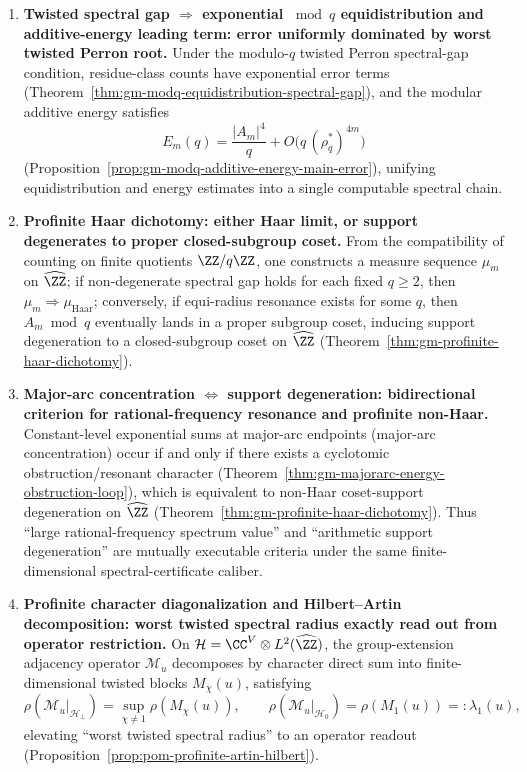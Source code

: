 \begin{enumerate}
  \item \textbf{Twisted spectral gap \texorpdfstring{$\Rightarrow$}{=>} exponential \texorpdfstring{$\bmod q$}{mod q} equidistribution and additive-energy leading term: error uniformly dominated by worst twisted Perron root.}
  Under the modulo-\(q\) twisted Perron spectral-gap condition, residue-class counts have exponential error terms (Theorem~\ref{thm:gm-modq-equidistribution-spectral-gap}), and the modular additive energy satisfies
  \[
  E_m(q)=\frac{|A_m|^4}{q}+O\!\bigl(q\,(\rho_q^\ast)^{4m}\bigr)
  \]
  (Proposition~\ref{prop:gm-modq-additive-energy-main-error}), unifying equidistribution and energy estimates into a single computable spectral chain.

  \item \textbf{Profinite Haar dichotomy: either Haar limit, or support degenerates to proper closed-subgroup coset.}
  From the compatibility of counting on finite quotients \(\ZZ/q\ZZ\), one constructs a measure sequence \(\mu_m\) on \(\widehat{\ZZ}\); if non-degenerate spectral gap holds for each fixed \(q\ge 2\), then \(\mu_m\Rightarrow \mu_{\mathrm{Haar}}\);
  conversely, if equi-radius resonance exists for some \(q\), then \(A_m\bmod q\) eventually lands in a proper subgroup coset, inducing support degeneration to a closed-subgroup coset on \(\widehat{\ZZ}\) (Theorem~\ref{thm:gm-profinite-haar-dichotomy}).

  \item \textbf{Major-arc concentration \texorpdfstring{$\Longleftrightarrow$}{<->} support degeneration: bidirectional criterion for rational-frequency resonance and profinite non-Haar.}
  Constant-level exponential sums at major-arc endpoints (major-arc concentration) occur if and only if there exists a cyclotomic obstruction/resonant character (Theorem~\ref{thm:gm-majorarc-energy-obstruction-loop}), which is equivalent to non-Haar coset-support degeneration on \(\widehat{\ZZ}\) (Theorem~\ref{thm:gm-profinite-haar-dichotomy}).
  Thus ``large rational-frequency spectrum value'' and ``arithmetic support degeneration'' are mutually executable criteria under the same finite-dimensional spectral-certificate caliber.

  \item \textbf{Profinite character diagonalization and Hilbert--Artin decomposition: worst twisted spectral radius exactly read out from operator restriction.}
  On \(\mathcal{H}=\CC^V\otimes L^2(\widehat{\ZZ})\), the group-extension adjacency operator \(\mathcal{M}_u\) decomposes by character direct sum into finite-dimensional twisted blocks \(M_\chi(u)\), satisfying
  \[
  \rho(\mathcal{M}_u|_{\mathcal{H}_\perp})=\sup_{\chi\ne 1}\rho(M_\chi(u)),
  \qquad
  \rho(\mathcal{M}_u|_{\mathcal{H}_0})=\rho(M_1(u))=:\lambda_1(u),
  \]
  elevating ``worst twisted spectral radius'' to an operator readout (Proposition~\ref{prop:pom-profinite-artin-hilbert}).


\end{enumerate}
